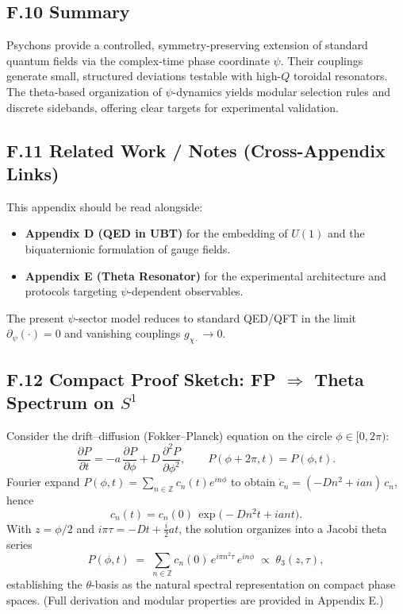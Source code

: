 \subsection*{F.10 Summary}
Psychons provide a controlled, symmetry-preserving extension of standard quantum fields via the complex-time phase coordinate $\psi$. Their couplings generate small, structured deviations testable with high-$Q$ toroidal resonators. The theta-based organization of $\psi$-dynamics yields modular selection rules and discrete sidebands, offering clear targets for experimental validation.


\subsection*{F.11 Related Work / Notes (Cross-Appendix Links)}
This appendix should be read alongside:
\begin{itemize}
\item \textbf{Appendix D (QED in UBT)} for the embedding of $U(1)$ and the biquaternionic formulation of gauge fields.
\item \textbf{Appendix E (Theta Resonator)} for the experimental architecture and protocols targeting $\psi$-dependent observables.
\end{itemize}
The present $\psi$-sector model reduces to standard QED/QFT in the limit $\partial_\psi(\cdot)=0$ and vanishing couplings $g_{\chi\cdot}\!\to\!0$.

\subsection*{F.12 Compact Proof Sketch: FP $\Rightarrow$ Theta Spectrum on $S^1$}
Consider the drift--diffusion (Fokker--Planck) equation on the circle $\phi\in[0,2\pi)$:
\begin{equation}
\frac{\partial P}{\partial t} = -a\,\frac{\partial P}{\partial \phi} + D\,\frac{\partial^2 P}{\partial \phi^2}, \qquad P(\phi+2\pi,t)=P(\phi,t).
\end{equation}
Fourier expand $P(\phi,t)=\sum_{n\in\mathbb{Z}} c_n(t) e^{i n \phi}$ to obtain $\dot{c}_n = (-D n^2 + i a n)\, c_n$, hence
\begin{equation}
c_n(t)=c_n(0)\,\exp\!\big(-D n^2 t + i a n t\big).
\end{equation}
With $z=\phi/2$ and $i\pi\tau=-Dt+\tfrac{i}{2} a t$, the solution organizes into a Jacobi theta series
\begin{equation}
P(\phi,t) \;=\; \sum_{n\in\mathbb{Z}} c_n(0)\, e^{i\pi n^2 \tau}\, e^{i n \phi} \;\propto\; \theta_3(z,\tau),
\end{equation}
establishing the $\theta$-basis as the natural spectral representation on compact phase spaces. (Full derivation and modular properties are provided in Appendix E.)

